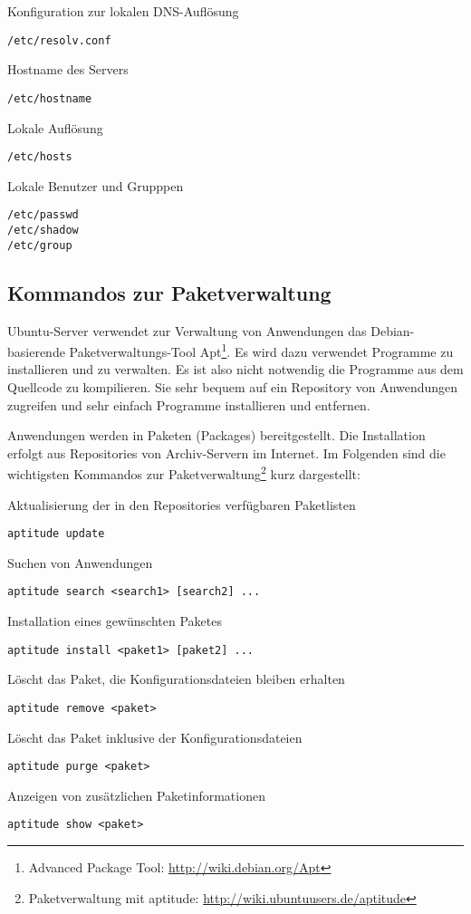 Konfiguration zur lokalen DNS-Auflösung
\begin{lstlisting}
/etc/resolv.conf
\end{lstlisting}

Hostname des Servers
\begin{lstlisting}
/etc/hostname
\end{lstlisting}

Lokale Auflösung
\begin{lstlisting}
/etc/hosts
\end{lstlisting}

Lokale Benutzer und Grupppen
\begin{lstlisting}
/etc/passwd
/etc/shadow
/etc/group
\end{lstlisting}


\subsection{Kommandos zur Paketverwaltung}
Ubuntu-Server verwendet zur Verwaltung von Anwendungen das Debian-basierende
Paket\-ver\-waltungs-Tool Apt\footnote{Advanced Package Tool:
\url{http://wiki.debian.org/Apt}}. Es wird dazu verwendet Programme zu
installieren und zu verwalten. Es ist also nicht notwendig die Programme aus dem
Quellcode zu kompilieren. Sie sehr bequem auf ein Repository von Anwendungen
zugreifen und sehr einfach Programme installieren und entfernen. 

Anwendungen werden in Paketen (Packages) bereitgestellt. Die Installation
erfolgt aus Repositories von Archiv-Servern im Internet. Im Folgenden sind die wichtigsten
Kommandos zur Paketverwaltung\footnote{Paketverwaltung mit aptitude:
\url{http://wiki.ubuntuusers.de/aptitude}} kurz dargestellt:

Aktualisierung der in den Repositories verfügbaren Paketlisten
\begin{lstlisting}
aptitude update
\end{lstlisting}

Suchen von Anwendungen
\begin{lstlisting}
aptitude search <search1> [search2] ...
\end{lstlisting}

Installation eines gewünschten Paketes
\begin{lstlisting}
aptitude install <paket1> [paket2] ...
\end{lstlisting}

Löscht das Paket, die Konfigurationsdateien bleiben erhalten
\begin{lstlisting}
aptitude remove <paket>
\end{lstlisting}

Löscht das Paket inklusive der Konfigurationsdateien
\begin{lstlisting}
aptitude purge <paket>
\end{lstlisting}

Anzeigen von zusätzlichen Paketinformationen
\begin{lstlisting}
aptitude show <paket>
\end{lstlisting}
